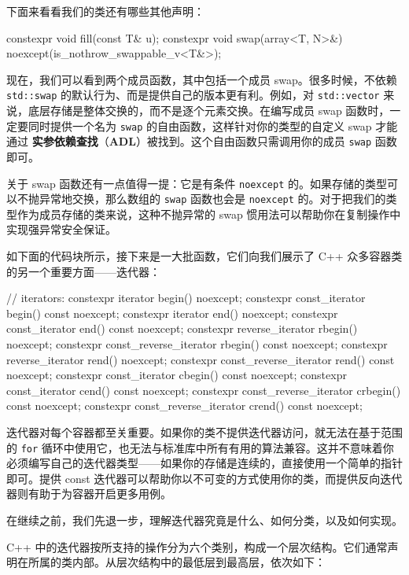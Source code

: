 下面来看看我们的类还有哪些其他声明：

\begin{codebox}[cpp]
  constexpr void fill(const T& u);
  constexpr void swap(array<T, N>&) noexcept(is_nothrow_swappable_v<T&>);
\end{codebox}

现在，我们可以看到两个成员函数，其中包括一个成员 swap。很多时候，不依赖 \texttt{std::swap} 的默认行为、而是提供自己的版本更有利。例如，对 \texttt{std::\allowbreak{}vector} 来说，底层存储是整体交换的，而不是逐个元素交换。在编写成员 swap 函数时，一定要同时提供一个名为 \texttt{swap} 的自由函数，这样针对你的类型的自定义 swap 才能通过 \textbf{实参依赖查找}（\textbf{ADL}）被找到。这个自由函数只需调用你的成员 \texttt{swap} 函数即可。

\label{idx:443}
\label{idx:444}
关于 swap 函数还有一点值得一提：它是有条件 \texttt{noexcept} 的。如果存储的类型可以不抛异常地交换，那么数组的 \texttt{swap} 函数也会是 \texttt{noexcept} 的。对于把我们的类型作为成员存储的类来说，这种不抛异常的 swap 惯用法可以帮助你在复制操作中实现强异常安全保证。

如下面的代码块所示，接下来是一大批函数，它们向我们展示了 C++ 众多容器类的另一个重要方面——迭代器：

\begin{codebox}[text]
// iterators:
constexpr iterator begin() noexcept;
constexpr const_iterator begin() const noexcept;
constexpr iterator end() noexcept;
constexpr const_iterator end() const noexcept;
constexpr reverse_iterator rbegin() noexcept;
constexpr const_reverse_iterator rbegin() const noexcept;
constexpr reverse_iterator rend() noexcept;
constexpr const_reverse_iterator rend() const noexcept;
constexpr const_iterator cbegin() const noexcept;
constexpr const_iterator cend() const noexcept;
constexpr const_reverse_iterator crbegin() const noexcept;
constexpr const_reverse_iterator crend() const noexcept;
\end{codebox}

迭代器对每个容器都至关重要。如果你的类不提供迭代器访问，就无法在基于范围的 \texttt{for} 循环中使用它，也无法与标准库中所有有用的算法兼容。这并不意味着你必须编写自己的迭代器类型——如果你的存储是连续的，直接使用一个简单的指针即可。提供 const 迭代器可以帮助你以不可变的方式使用你的类，而提供反向迭代器则有助于为容器开启更多用例。

在继续之前，我们先退一步，理解迭代器究竟是什么、如何分类，以及如何实现。

C++ 中的迭代器按所支持的操作分为六个类别，构成一个层次结构。它们通常声明在所属的类内部。从层次结构中的最低层到最高层，依次如下：

